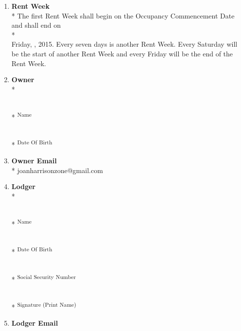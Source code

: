 \documentclass[12pt,letterpaper]{article}
\newcommand{\datefillin}{\hspace{0.2cm}\makebox[3cm]{\hrulefill}}
\newcommand{\ownermail}{Owner Email}
\newcommand{\firstday}{Occupancy Commencement Date}
\newcommand{\rentweek}{Rent Week}
\newcommand{\lemail}{Lodger Email}
\begin{document}
\begin{multicols}{2}
\begin{enumerate}
		\item \textbf{\rentweek{}}\\* \label{rentweek}
			The first \rentweek{} shall begin on the \firstday{} and shall end on \\* \\
			Friday, \datefillin, 2015. Every seven days is another \rentweek{}. Every Saturday will be the start of another \rentweek{} and every Friday will be the end of the \rentweek{}.
			
		\item \textbf{Owner}\\* \label{owner}
			\begin{minipage}[t]{2in}

				\vspace{0.5cm}\makebox[2in]{\hrulefill} \\*
				\textsuperscript{Name}
				
				\vspace{0.5cm}\makebox[2in]{\hrulefill} \\*
				\textsuperscript{Date Of Birth}
			\end{minipage}%

		\item \textbf{\ownermail{}}\\* \label{ownermail}
			joanharrisonzone@gmail.com

		\item \textbf{Lodger}\\* \label{lodger}
			\begin{minipage}[t]{2in}

				\vspace{0.5cm}\makebox[2in]{\hrulefill} \\*
				\textsuperscript{Name}
				
				\vspace{0.5cm}\makebox[2in]{\hrulefill} \\*
				\textsuperscript{Date Of Birth}
				
				\vspace{0.5cm}\makebox[2in]{\hrulefill} \\*
				\textsuperscript{Social Security Number}
				
				\vspace{0.5cm}\makebox[2in]{\hrulefill} \\*
				\textsuperscript{Signature (Print Name)}
			\end{minipage}%

		\item \textbf{\lemail{}} \label{lemail}

			\vspace{0.5cm}\makebox[2in]{\hrulefill}

			\vspace{0.5cm}\makebox[2in]{\hrulefill}
	\end{enumerate}
\end{multicols}
\end{document}
